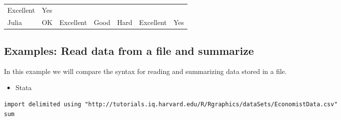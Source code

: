\documentclass[]{book}
\providecommand{\tightlist}{%
  \setlength{\itemsep}{0pt}\setlength{\parskip}{0pt}}
\begin{document}
\begin{longtable}[]{@{}lllllll@{}}
\begin{minipage}[t]{0.17\columnwidth}
Excellent\strut
\end{minipage} & \begin{minipage}[t]{0.05\columnwidth}\raggedright\strut
Yes\strut
\end{minipage}\tabularnewline
\begin{minipage}[t]{0.08\columnwidth}\raggedright\strut
Julia\strut
\end{minipage} & \begin{minipage}[t]{0.11\columnwidth}\raggedright\strut
OK\strut
\end{minipage} & \begin{minipage}[t]{0.13\columnwidth}\raggedright\strut
Excellent\strut
\end{minipage} & \begin{minipage}[t]{0.16\columnwidth}\raggedright\strut
Good\strut
\end{minipage} & \begin{minipage}[t]{0.11\columnwidth}\raggedright\strut
Hard\strut
\end{minipage} & \begin{minipage}[t]{0.17\columnwidth}\raggedright\strut
Excellent\strut
\end{minipage} & \begin{minipage}[t]{0.05\columnwidth}\raggedright\strut
Yes\strut
\end{minipage}\tabularnewline
\bottomrule
\end{longtable}

\subsection{Examples: Read data from a file and
summarize}\label{examples-read-data-from-a-file-and-summarize}

In this example we will compare the syntax for reading and summarizing
data stored in a file.

\begin{itemize}
\tightlist
\item
  Stata
\end{itemize}

\begin{verbatim}
import delimited using "http://tutorials.iq.harvard.edu/R/Rgraphics/dataSets/EconomistData.csv"
sum
\end{verbatim}
\end{document}

